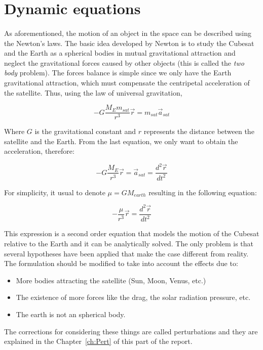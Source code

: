 
\section{Dynamic equations}
\paragraph{}
As aforementioned, the motion of an object in the space can be described using the Newton's laws. The basic idea developed by Newton is to study the Cubesat and the Earth as a spherical bodies in mutual gravitational attraction and neglect the gravitational forces caused by other objects (this is called the \textit{two body} problem). The forces balance is simple since we only have the Earth gravitational attraction, which must compensate the centripetal acceleration of the satellite. Thus, using the law of universal gravitation,

\begin{equation}
-G\frac{M_{E}m_{sat}}{r^3}\vec{r}=m_{sat}\vec{a}_{sat}
\end{equation}

Where $G$ is the gravitational constant and $r$ represents the distance between the satellite and the Earth. From the last equation, we only want to obtain the acceleration, therefore:

\begin{equation}
-G\frac{M_{E}}{r^3}\vec{r}=\vec{a}_{sat}=\frac{d^2 \vec{r}}{d t^2}
\end{equation}

For simplicity, it usual to denote $\mu=GM_{earth}$ resulting in the following equation:

\begin{equation}\label{eq:a1}
-\frac{\mu}{r^3}\vec{r}=\frac{d^2 \vec{r}}{d t^2}
\end{equation}

This expression is a second order equation that models the motion of the Cubesat relative to the Earth and it can be analytically solved. The only problem is that several hypotheses have been applied that make the case different from reality. The formulation should be modified to take into account the effects due to:
\begin{itemize}
	\item More bodies attracting the satellite (Sun, Moon, Venus, etc.)
	\item The existence of more forces like the drag, the solar radiation pressure, etc.
	\item The earth is not an spherical body.
\end{itemize}
The corrections for considering these things are called perturbations and they are explained in the Chapter~\ref{ch:Pert} of this part of the report.
	